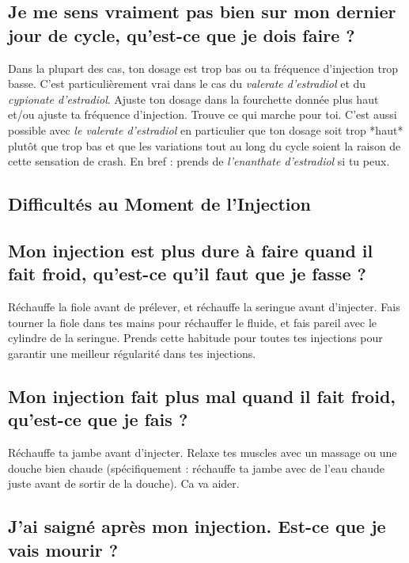 \documentclass{article}
\begin{document}
\subsection{Je me sens vraiment pas bien sur mon dernier jour de cycle, qu'est-ce que je dois faire ?}\label{7-3}

Dans la plupart des cas, ton dosage est trop bas ou ta fréquence d'injection trop basse. C'est particulièrement vrai dans le cas du \textit{valerate d'estradiol} et du \textit{cypionate d'estradiol}. Ajuste ton dosage dans la fourchette donnée plus haut et/ou ajuste ta fréquence d'injection. Trouve ce qui marche pour toi. C'est aussi possible avec \textit{le valerate d'estradiol} en particulier que ton dosage soit trop *haut* plutôt que trop bas et que les variations tout au long du cycle soient la raison de cette sensation de crash. En bref : prends de \textit{l'enanthate d'estradiol} si tu peux.

\subsection*{Difficultés au Moment de l'Injection}

\subsection{Mon injection est plus dure à faire quand il fait froid, qu'est-ce qu'il faut que je fasse ?}

Réchauffe la fiole avant de prélever, et réchauffe la seringue avant d'injecter. Fais tourner la fiole dans tes mains pour réchauffer le fluide, et fais pareil avec le cylindre de la seringue. Prends cette habitude pour toutes tes injections pour garantir une meilleur régularité dans tes injections.  

\subsection{Mon injection fait plus mal quand il fait froid, qu'est-ce que je fais ?}

Réchauffe ta jambe avant d'injecter. Relaxe tes muscles avec un massage ou une douche bien chaude (spécifiquement : réchauffe ta jambe avec de l'eau chaude juste avant de sortir de la douche). Ca va aider.

\subsection{J'ai saigné après mon injection. Est-ce que je vais mourir ?}
\end{document}
